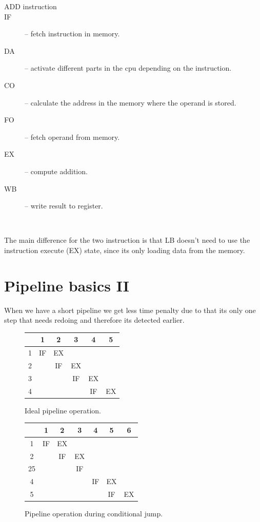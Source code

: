 \documentclass[titlepage, a4paper]{article}
\begin{document}
\begin{description}
\item[ADD instruction]
\item[IF] -- fetch instruction in memory.
\item[DA] -- activate different parts in the cpu depending on the instruction.
\item[CO] -- calculate the address in the memory where the operand is stored. 
\item[FO] -- fetch operand from memory.
\item[EX] -- compute addition.
\item[WB] -- write result to register.
\end{description}
~\newline

The main difference for the two instruction is that LB doesn't need to use the instruction execute (EX) state, since its only loading data from the memory.

\section{Pipeline basics II}
When we have a short pipeline we get less time penalty due to that its only one step that needs redoing and therefore its detected earlier. \\

\begin{figure}[H]
  \centering
  \begin{tabular}{|c|c|c|c|c|c|}
    \hline
        {} & {1} & {2} & {3} & {4} & {5} \\ \hline
        {1} & {IF} & {EX} & {} & {} & {} \\ \hline
        {2} & {} & {IF} & {EX} & {} & {} \\ \hline
        {3} & {} & {} & {IF} & {EX} & {} \\ \hline
        {4} & {} & {} & {} & {IF} & {EX} \\ \hline
  \end{tabular}
  \caption{Ideal pipeline operation.}
  \label{fig:ideal_pipe_op}
\end{figure}

\begin{figure}[H]
  \centering
  \begin{tabular}{|c|c|c|c|c|c|c|}
    \hline
        {} & {1} & {2} & {3} & {4} & {5} & {6} \\ \hline
        {1} & {IF} & {EX} & {} & {} & {} & {} \\ \hline
        {2} & {} & {IF} & {EX} & {} & {} & {} \\ \hline
        {25} & {} & {} & {IF} & {} & {} & {} \\ \hline
        {4} & {} & {} & {} & {IF} & {EX} & {} \\ \hline
        {5} & {} & {} & {} & {} & {IF} & {EX} \\ \hline
  \end{tabular}
  \caption{Pipeline operation during conditional jump.}
  \label{fig:condjmp_pipe_op}
\end{figure}
\end{document}
